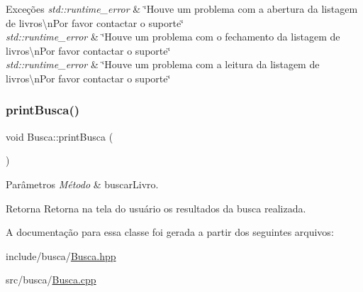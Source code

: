 \begin{DoxyExceptions}{Exceções}
{\em std\+::runtime\+\_\+error} & \char`\"{}\+Houve um problema com a abertura da listagem de livros\textbackslash{}n\+Por favor contactar o suporte\char`\"{} \\
\hline
{\em std\+::runtime\+\_\+error} & \char`\"{}\+Houve um problema com o fechamento da listagem de livros\textbackslash{}n\+Por favor contactar o suporte\char`\"{} \\
\hline
{\em std\+::runtime\+\_\+error} & \char`\"{}\+Houve um problema com a leitura da listagem de livros\textbackslash{}n\+Por favor contactar o suporte\char`\"{} \\
\hline
\end{DoxyExceptions}
\mbox{\label{class_busca_aa04fd71e97f268b784256fa71daaaccb}} 
\subsubsection{\texorpdfstring{printBusca()}{printBusca()}}
{\footnotesize\ttfamily void Busca\+::print\+Busca (\begin{DoxyParamCaption}{ }\end{DoxyParamCaption})}


\begin{DoxyParams}{Parâmetros}
{\em Método} & buscar\+Livro. \\
\hline
\end{DoxyParams}
\begin{DoxyReturn}{Retorna}
Retorna na tela do usuário os resultados da busca realizada. 
\end{DoxyReturn}


A documentação para essa classe foi gerada a partir dos seguintes arquivos\+:\begin{DoxyCompactItemize}
\item 
include/busca/\mbox{\hyperlink{_busca_8hpp}{Busca.\+hpp}}\item 
src/busca/\mbox{\hyperlink{_busca_8cpp}{Busca.\+cpp}}\end{DoxyCompactItemize}
